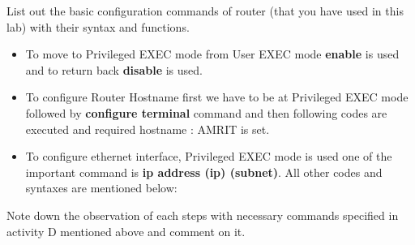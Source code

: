 \documentclass[12pt]{article}
\begin{document}
\begin{Q}
      {
            List out the basic configuration commands of router (that you have used in this lab) with their syntax and functions.\\
      }
\end{Q}
\begin{itemize}
      \item To move to Privileged EXEC mode from User EXEC mode \textbf{enable} is used  and to return back \textbf{disable} is used.

      \item To configure Router Hostname  first we have to be at Privileged EXEC mode followed by \textbf{configure terminal} command and then following codes are executed and required hostname : AMRIT is set.
      \item To configure ethernet interface, Privileged EXEC mode is used one of the important command is \textbf{ip address (ip) (subnet)}. All other codes and syntaxes are mentioned below:
\end{itemize}



\begin{Q}
      {
            Note down the observation of each steps with necessary commands specified in activity D
            mentioned above and comment on it.
      }
\end{Q}
\end{document}
